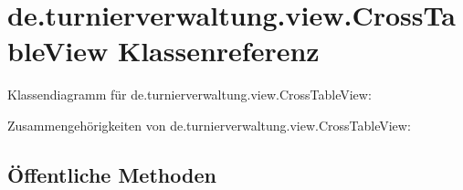 \hypertarget{classde_1_1turnierverwaltung_1_1view_1_1_cross_table_view}{}\section{de.\+turnierverwaltung.\+view.\+Cross\+Table\+View Klassenreferenz}
\label{classde_1_1turnierverwaltung_1_1view_1_1_cross_table_view}


Klassendiagramm für de.\+turnierverwaltung.\+view.\+Cross\+Table\+View\+:


Zusammengehörigkeiten von de.\+turnierverwaltung.\+view.\+Cross\+Table\+View\+:
\subsection*{Öffentliche Methoden}
